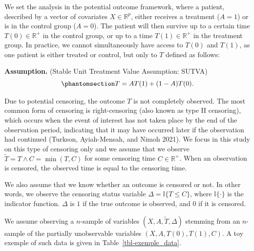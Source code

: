 \documentclass[
  11pt,
  a4paper,
]{article}
\theoremstyle{plain}
\theoremstyle{plain}
\theoremstyle{plain}
\theoremstyle{definition}
\theoremstyle{remark}
\begin{document}
We set the analysis in the potential outcome framework, where a patient,
described by a vector of covariates \(X \in \mathbb{R}^p\), either
receives a treatment (\(A=1\)) or is in the control group (\(A=0\)). The
patient will then survive up to a certain time \(T(0) \in \mathbb{R}^+\)
in the control group, or up to a time \(T(1)\in \mathbb{R}^+\) in the
treatment group. In practice, we cannot simultaneously have access to
\(T(0)\) and \(T(1)\), as one patient is either treated or control, but
only to \(T\) defined as follows:

\textbf{Assumption.} (Stable Unit Treatment Value Assumption: SUTVA)
\begin{equation}\phantomsection\label{eq-sutva}{ 
T = AT(1) + (1-A)T(0).
}\end{equation}

Due to potential censoring, the outcome \(T\) is not completely
observed. The most common form of censoring is right-censoring (also
known as type II censoring), which occurs when the event of interest has
not taken place by the end of the observation period, indicating that it
may have occurred later if the observation had continued (Turkson,
Ayiah-Mensah, and Nimoh 2021). We focus in this study on this type of
censoring only and we assume that we observe
\(\tilde T= T \wedge C = \min(T,C)\) for some censoring time
\(C \in \mathbb{R}^+\). When an observation is censored, the observed
time is equal to the censoring time.

We also assume that we know whether an outcome is censored or not. In
other words, we observe the censoring status variable
\(\Delta = \mathbb{I}\{T \leqslant C\}\), where \(\mathbb{I}\{\cdot\}\)
is the indicator function. \(\Delta\) is \(1\) if the true outcome is
observed, and \(0\) if it is censored.

We assume observing a \(n\)-sample of variables
\((X,A,\widetilde T,\Delta)\) stemming from an \(n\)-sample of the
partially unobservable variables \((X,A,T(0),T(1),C)\). A toy exemple of
such data is given in Table~\ref{tbl-exemple_data}.
\end{document}
